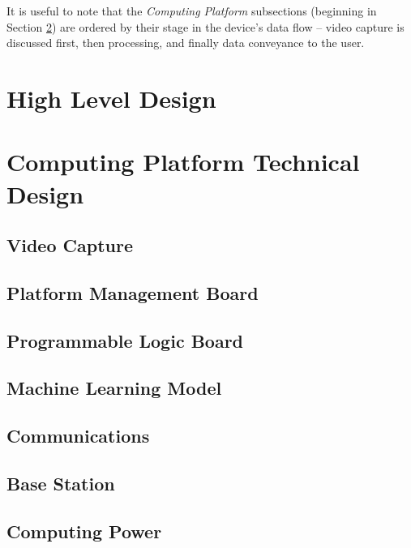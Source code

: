 \documentclass[10pt,letterpaper]{article}
\begin{document}
It is useful to note that the \textit{Computing Platform} subsections (beginning in Section \ref{computing_platform}) are ordered by their stage in the device's data flow -- video capture is discussed first, then processing, and finally data conveyance to the user.

\newpage
\section{High Level Design}\label{high_level_design}


\section{Computing Platform Technical Design}\label{computing_platform}

\subsection{Video Capture}\label{video_capture}


\subsection{Platform Management Board}\label{platform_management}


\subsection{Programmable Logic Board}\label{programmable_logic}


\subsection{Machine Learning Model}\label{machine_learning}


\subsection{Communications}\label{communications}


\subsection{Base Station}\label{base_station}


\subsection{Computing Power}\label{computing_power}

\end{document}
